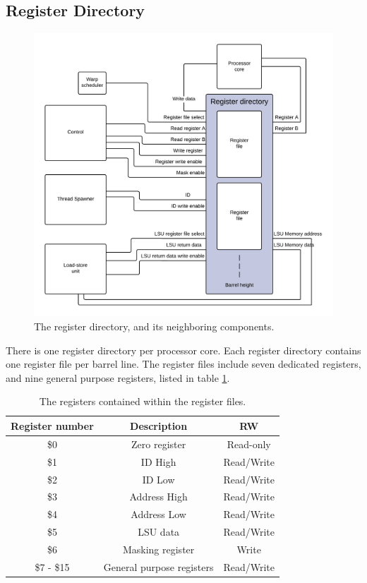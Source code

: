 \subsection{Register Directory}
\begin{figure}[H]
	\centering
	\includegraphics[width=\textwidth]{../gpu/diagrams/register_directory.png}
	\caption{The register directory, and its neighboring components.}
	\label{fig:register_directory}
\end{figure}

There is one register directory per processor core.
Each register directory contains one register file per barrel line.
The register files include seven dedicated registers, and nine general purpose registers, listed in table \ref{tab:registers_overview}.

\begin{table}[H]
	\centering
	\begin{tabular}{|c|c|c|}
		\hline Register number & Description & RW \\ 
		\hline \$0 & Zero register & Read-only \\ 
		\hline \$1 & ID High & Read/Write \\ 
		\hline \$2 & ID Low & Read/Write \\ 
		\hline \$3 & Address High & Read/Write \\ 
		\hline \$4 & Address Low & Read/Write \\ 
		\hline \$5 & LSU data & Read/Write \\ 
		\hline \$6 & Masking register & Write \\ 
		\hline \$7 - \$15 & General purpose registers & Read/Write \\ 
		\hline 
	\end{tabular} 
	\caption{The registers contained within the register files.}
	\label{tab:registers_overview}
\end{table}

